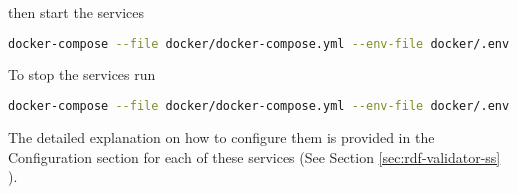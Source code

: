 then start the services

\begin{lstlisting}[language=bash,]
docker-compose --file docker/docker-compose.yml --env-file docker/.env up -d
\end{lstlisting}

To stop the services run

\begin{lstlisting}[language=bash,]
docker-compose --file docker/docker-compose.yml --env-file docker/.env down
\end{lstlisting}

The detailed explanation on how to configure them is provided in the Configuration section for each of these services (See Section \ref{sec:rdf-validator-ss} ).
